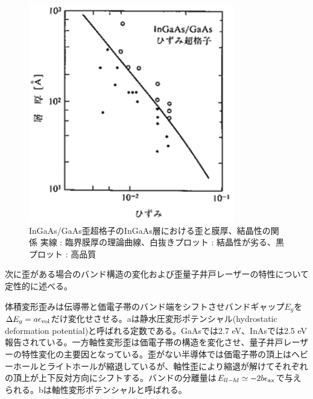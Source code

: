 \begin{figure}[h]
	\centering
	\includegraphics[width=9cm]{figure/fig_1_2_strain_vs_d.png}
	\caption[InGaAs/GaAs歪超格子のInGaAs層における歪と膜厚、結晶性の関係]{InGaAs/GaAs歪超格子のInGaAs層における歪と膜厚、結晶性の関係
	\protect\newline 実線 : 臨界膜厚の理論曲線、白抜きプロット : 結晶性が劣る、黒プロット : 高品質}
	\label{fig:fig_1_2_strain_vs_d}
\end{figure}

次に歪がある場合のバンド構造の変化および歪量子井戸レーザーの特性について定性的に述べる。

体積変形歪みは伝導帯と価電子帯のバンド端をシフトさせバンドギャップ$E_{g}$を$\Delta E_{g}=a\epsilon_{\rm{vol}}$だけ変化せさせる。aは静水圧変形ポテンシャル(hydrostatic deformation potential)と呼ばれる定数である。GaAsでは2.7 eV、InAsでは2.5 eV報告されている\cite{ref_adachi}。一方軸性変形歪は価電子帯の構造を変化させ、量子井戸レーザーの特性変化の主要因となっている。歪がない半導体では価電子帯の頂上はヘビーホールとライトホールが縮退しているが、軸性歪により縮退が解けてそれぞれの頂上が上下反対方向にシフトする。バンドの分離量は$E_{ll-hl}\simeq -2b\epsilon_{\rm{ax}}$で与えられる。bは軸性変形ポテンシャルと呼ばれる。


